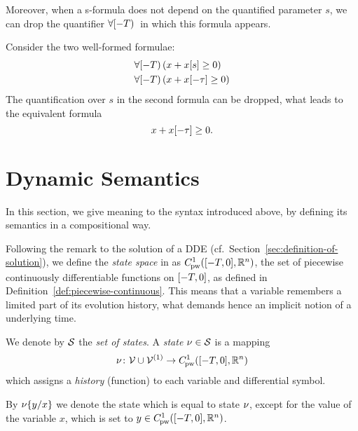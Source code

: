     Moreover, when a s-formula does not depend on the quantified parameter $s$, we can drop the quantifier $\hs{}$ in which this formula appears.

    \begin{example}
        Consider the two well-formed \ddL formulae:
        \begin{align*}
            &\hs{(x+\x[s]\geq 0)}\\
            &\hs{(x+\x[-\tau]\geq 0)} 
        \end{align*}
        The quantification over $s$ in the second formula can be dropped, what leads to the equivalent formula
        \begin{equation*}
            x+\x[-\tau]\geq 0.
        \end{equation*}
    \end{example}


\section{Dynamic Semantics}
    \label{sec:dynamic-semantics}


    In this section, we give meaning to the syntax introduced above, by defining its semantics in a compositional way.

    Following the remark to the solution of a DDE (cf.\ Section~\ref{sec:definition-of-solution}), we define the \emph{state space} in \ddL as $\statespace$, the set of piecewise continuously differentiable functions on $\closeddelayinterval$, as defined in Definition~\ref{def:piecewise-continuous}.
    This means that a variable remembers a limited part of its evolution history, what demands hence an implicit notion of a underlying time.

    We denote by $\states$ the \emph{set of states}. A \emph{state} $\asstate\in\states$ is a mapping
    \begin{equation}
        \asstate \from \allvars\cup\diffvars \to \statespace
    \end{equation}
    which assigns a \emph{history} (function) to each variable and differential symbol.

    By $\modif{\asstate}{x}{y}$ we denote the state which is equal to state $\asstate$, except for the value of the variable $x$, which is set to $y\in\statespace$.



